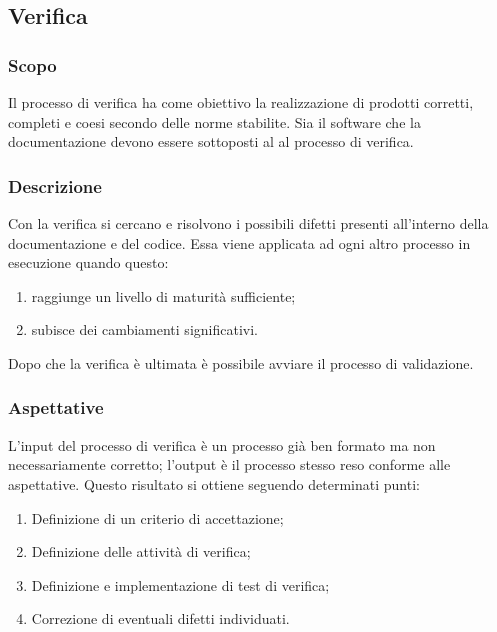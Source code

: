 \subsection{Verifica}
\subsubsection{Scopo}
Il processo di verifica ha come obiettivo la realizzazione di prodotti corretti, completi e coesi secondo delle norme stabilite. Sia il software che la documentazione devono essere sottoposti al  al processo di verifica.

\subsubsection{Descrizione}
Con la verifica si cercano e  risolvono i possibili difetti presenti all'interno della documentazione e del codice. Essa viene applicata ad ogni altro processo in esecuzione quando questo:
\begin{enumerate}
    \item raggiunge un livello di maturità sufficiente;
    \item subisce dei cambiamenti significativi.
\end{enumerate} 
Dopo che la verifica è ultimata è possibile avviare il processo di validazione.  

\subsubsection{Aspettative}
L'input del processo di verifica è un processo già ben formato ma non necessariamente corretto; l'output è il processo stesso reso conforme alle aspettative. Questo risultato si ottiene seguendo determinati punti:
\begin{enumerate}
    \item Definizione di un criterio di accettazione;
    \item Definizione delle attività di verifica;
    \item Definizione e implementazione di test di verifica;
    \item Correzione di eventuali difetti individuati.
\end{enumerate}

